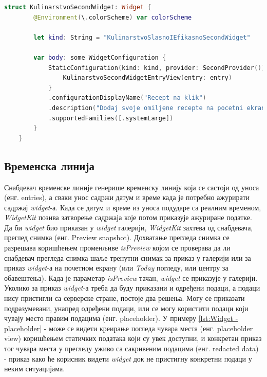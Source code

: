 \documentclass[12pt,oneside]{memoir}
\begin{document}
\begin{lstlisting}[caption=\textit{{Widget - почетна конфигурација}}, label={lst:Widget - почетна конфигурација}, language=Swift, frame=single]
    struct KulinarstvoSecondWidget: Widget {
        @Environment(\.colorScheme) var colorScheme
        
        let kind: String = "KulinarstvoSlasnoIEfikasnoSecondWidget"
        
        var body: some WidgetConfiguration {
            StaticConfiguration(kind: kind, provider: SecondProvider()) { entry in
                KulinarstvoSecondWidgetEntryView(entry: entry)
            }
            .configurationDisplayName("Recept na klik")
            .description("Dodaj svoje omiljene recepte na pocetni ekran")
            .supportedFamilies([.systemLarge])
        }
    }
\end{lstlisting}

\subsection{Временска линија}
\label{subsec:Временска линија}
\indent Снабдевач временске линије генерише временску линију која се састоји од уноса (енг. entries), а сваки унос садржи датум и време када је потребно ажурирати садржај \textit{widget}-а. Када се датум и време из уноса подударе са реалним временом, \textit{WidgetKit} позива затворење садржаја које потом приказује ажуриране податке. 
\\
\indent Да би \textit{widget} био приказан у \textit{widget} галерији, \textit{WidgetKit} захтева од снабдевача, преглед снимка (енг. Preview snapshot). Дохватање прегледа снимка се разрешава коришћењем променљиве \textit{isPreview} којом се проверава да ли снабдевач прегледа снимка шаље тренутни снимак за приказ у галерији или за приказ \textit{widget}-а на почетном екрану (или \textit{Today} погледу, или центру за обавештења). Када је параметар \textit{isPreview} тачан, \textit{widget} се приказује у галерији. Уколико за приказ \textit{widget}-а треба да буду приказани и одређени подаци, а подаци нису пристигли са серверске стране, постоје два решења. Могу се приказати подразумевани, унапред одређени подаци, или се могу користити подаци који чувају место правим подацима (енг. placeholder). У примеру \ref{lst:Widget - placeholder} -  може се видети креирање погледа чувара места (енг. placeholder view) коришћењем статичких података који су увек доступни, и конкретан приказ тог чувара места у прегледу уживо са сакривеним подацима (енг. redacted data) - приказ како ће корисник видети \textit{widget} док не пристигну конкретни подаци у неким ситуацијама.
\end{document}
